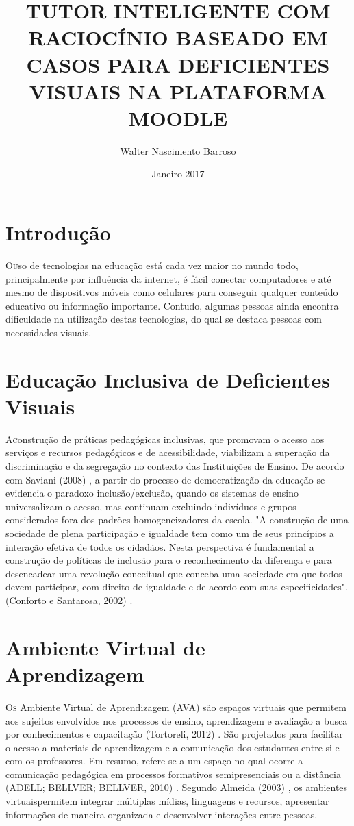 \documentclass{article}
\title{TUTOR INTELIGENTE COM RACIOCÍNIO BASEADO EM CASOS PARA DEFICIENTES VISUAIS NA PLATAFORMA MOODLE}
\author{Walter Nascimento Barroso}
\date{Janeiro 2017}
\begin{document}
\maketitle

\section{Introdução}
\lettrine{O} uso de tecnologias na educação está cada vez maior no mundo todo, principalmente por influência da internet, é fácil conectar computadores e até mesmo de dispositivos móveis como celulares para conseguir qualquer conteúdo educativo ou informação importante. Contudo, algumas pessoas ainda encontra dificuldade na utilização destas tecnologias, do qual se destaca pessoas com necessidades visuais.

\section{Educação Inclusiva de Deficientes Visuais}
\lettrine{A} construção de práticas pedagógicas inclusivas, que promovam o acesso aos serviços e recursos pedagógicos e de acessibilidade, viabilizam a superação da discriminação e da segregação no contexto das Instituições de Ensino. De acordo com Saviani (2008) \citep{mattioli2013saviani}, a partir do processo de democratização da educação se evidencia o paradoxo inclusão/exclusão, quando os sistemas de ensino universalizam o acesso, mas continuam excluindo indivíduos e grupos considerados fora dos padrões homogeneizadores da escola. "A construção de uma sociedade de plena participação e igualdade tem como um de seus princípios a interação efetiva de todos os cidadãos. Nesta perspectiva é fundamental a construção de políticas de inclusão para o reconhecimento da diferença e para desencadear uma revolução conceitual que conceba uma sociedade em que todos devem participar, com direito de igualdade e de acordo com suas especificidades". (Conforto e Santarosa, 2002) \citep{conforto2002acessibilidade}.

\section{Ambiente Virtual de Aprendizagem}
\lettrine{O}{s} Ambiente Virtual de Aprendizagem (AVA) são espaços virtuais que permitem aos sujeitos envolvidos nos processos de ensino, aprendizagem e avaliação a busca por conhecimentos e capacitação (Tortoreli, 2012) \citep{tortoreli2012interaccao}. São projetados para facilitar o acesso a materiais de aprendizagem e a comunicação dos estudantes entre si e com os professores. Em resumo, refere-se a um espaço no qual ocorre a comunicação pedagógica em processos formativos semipresenciais ou a distância (ADELL; BELLVER; BELLVER, 2010) \citep{palacio2016analise}. Segundo Almeida (2003) \citep{de2003ambientes}, os ambientes virtuaispermitem integrar múltiplas mídias, linguagens e recursos, apresentar informações de maneira organizada e desenvolver interações entre pessoas.
\end{document}
